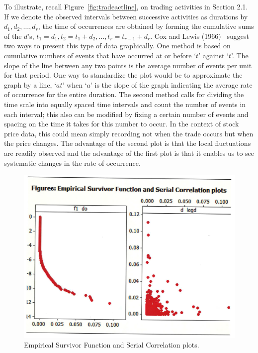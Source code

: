 To illustrate, recall Figure~\ref{fig:tradeactline}, on trading activities in Section 2.1. If we denote the observed intervals between successive activities as durations by $d_1, d_2,\ldots,d_r$, the time of occurrences are obtained by forming the cumulative sums of the $d$'s, $t_1=d_1, t_2=t_1+d_2, \ldots, t_r=t_{r-1}+d_r$. Cox and Lewis (1966)~\cite{cox1966} suggest two ways to present this type of data graphically. One method is based on cumulative numbers of events that have occurred at or before `$t$' against `$t$'. The slope of the line between any two points is the average number of events per unit for that period. One way to standardize the plot would be to approximate the graph by a line, `$at$' when `$a$' is the slope of the graph indicating the average rate of occurrence for the entire duration. The second method calls for dividing the time scale into equally spaced time intervals and count the number of events in each interval; this also can be modified by fixing a certain number of events and spacing on the time it takes for this number to occur. In the context of stock price data, this could mean simply recording not when the trade occurs but when the price changes. The advantage of the second plot is that the local fluctuations are readily observed and the advantage of the first plot is that it enables us to see systematic changes in the rate of occurrence.
 
 	\begin{figure}[!ht]
	\centering	
	\includegraphics[width=\textwidth]{chapters/chapter_uvts/figures/Sec2-10Fig6.png}
	\caption{Empirical Survivor Function and Serial Correlation plots. \label{fig:survivor}}
	\end{figure}
	
